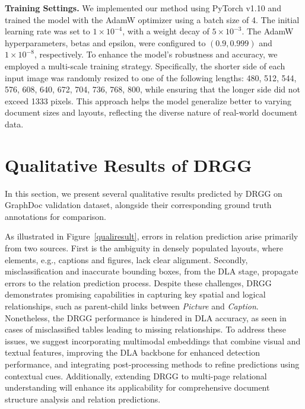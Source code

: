 \noindent \textbf{Training Settings.} We implemented our method using PyTorch v1.10 and trained the model with the AdamW optimizer using a batch size of 4. The initial learning rate was set to $1 \times 10^{-4}$, with a weight decay of $5 \times 10^{-3}$. The AdamW hyperparameters, betas and epsilon, were configured to $(0.9, 0.999)$ and $1 \times 10^{-8}$, respectively. To enhance the model's robustness and accuracy, we employed a multi-scale training strategy. Specifically, the shorter side of each input image was randomly resized to one of the following lengths: {480, 512, 544, 576, 608, 640, 672, 704, 736, 768, 800}, while ensuring that the longer side did not exceed 1333 pixels. This approach helps the model generalize better to varying document sizes and layouts, reflecting the diverse nature of real-world document data.

\section{Qualitative Results of DRGG}
In this section, we present several qualitative results predicted by DRGG on GraphDoc validation dataset, alongside their corresponding ground truth annotations for comparison. 



As illustrated in Figure~\ref{qualiresult}, {errors in relation prediction arise primarily from two sources. First is the ambiguity in densely populated layouts, where elements, e.g., captions and figures, lack clear alignment. Secondly, misclassification and inaccurate bounding boxes, from the DLA stage, propagate errors to the relation prediction process. Despite these challenges, DRGG demonstrates promising capabilities in capturing key spatial and logical relationships, such as parent-child links between \textit{Picture} and \textit{Caption}. Nonetheless, the DRGG performance is hindered in DLA accuracy, as seen in cases of misclassified tables leading to missing relationships. To address these issues, we suggest incorporating multimodal embeddings that combine visual and textual features, improving the DLA backbone for enhanced detection performance, and integrating post-processing methods to refine predictions using contextual cues. Additionally, extending DRGG to multi-page relational understanding will enhance its applicability for comprehensive document structure analysis and relation predictions. }




